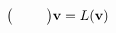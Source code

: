 \documentclass[preview]{standalone}
\begin{document}
\begin{align*}
\big( \hphantom{u_x} \; \hphantom{u_y} \big) \mathbf{v} = L ( \mathbf{v} )
\end{align*}
\end{document}
